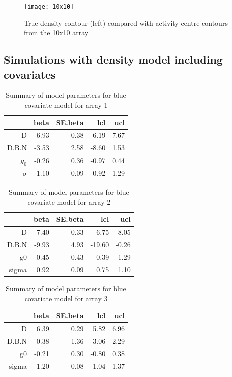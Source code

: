 \documentclass[a4paper,12pt]{article}
\begin{document}
\begin{figure}[h]
\centering
\texttt{[image: 10x10]}
\caption{True density contour (left) compared with activity centre contours from the 10x10 array}
\label{10x10}
\end{figure}


\subsection{Simulations with density model including covariates}


\begin{table}[H]
\centering
\begin{tabular}{rrrrr}
  \hline
 & beta & SE.beta & lcl & ucl \\ 
  \hline
D & 6.93 & 0.38 & 6.19 & 7.67 \\ 
  D.B.N & -3.53 & 2.58 & -8.60 & 1.53 \\ 
  $g_0$ & -0.26 & 0.36 & -0.97 & 0.44 \\ 
  $\sigma$ & 1.10 & 0.09 & 0.92 & 1.29 \\ 
   \hline
\end{tabular}
\caption{Summary of model parameters for blue covariate model for array 1}
\end{table}

\begin{table}[H]
\centering
\begin{tabular}{rrrrr}
  \hline
 & beta & SE.beta & lcl & ucl \\ 
  \hline
D & 7.40 & 0.33 & 6.75 & 8.05 \\ 
  D.B.N & -9.93 & 4.93 & -19.60 & -0.26 \\ 
  g0 & 0.45 & 0.43 & -0.39 & 1.29 \\ 
  sigma & 0.92 & 0.09 & 0.75 & 1.10 \\ 
   \hline
\end{tabular}
\caption{Summary of model parameters for blue covariate model for array 2}
\end{table}

\begin{table}[H]
\centering
\begin{tabular}{rrrrr}
  \hline
 & beta & SE.beta & lcl & ucl \\ 
  \hline
D & 6.39 & 0.29 & 5.82 & 6.96 \\ 
  D.B.N & -0.38 & 1.36 & -3.06 & 2.29 \\ 
  g0 & -0.21 & 0.30 & -0.80 & 0.38 \\ 
  sigma & 1.20 & 0.08 & 1.04 & 1.37 \\ 
   \hline
\end{tabular}
\caption{Summary of model parameters for blue covariate model for array 3}
\end{table}
\end{document}

